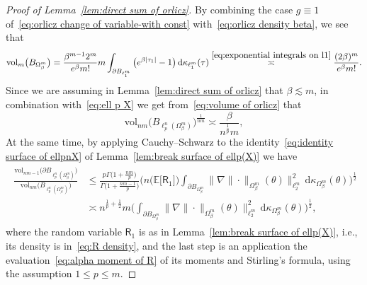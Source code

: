 \documentclass[11pt,reqno]{amsart}
\renewcommand{\le}{\leqslant}
\newcommand{\ud}[0]{\,\mathrm{d}}
\theoremstyle{remark}
\newcommand{\E}{\mathbb{ E}}
\newcommand{\vol}{\mathrm{vol}}
\renewcommand{\1}{\mathbf 1}
\begin{document}
\begin{proof}[Proof of Lemma~\ref{lem:direct sum of orlicz}] By combining the case $g\equiv 1$ of~\eqref{eq:orlicz change of variable-with const}  with~\eqref{eq:orlicz density beta}, we see that
\begin{equation}\label{eq:volume of orlicz}
\vol_m\big(B_{\Omega_\beta^m}\big)=\frac{\beta^{m-1}2^m}{e^\beta m!}m\int_{\partial B_{\ell_1^m}}  \big(e^{\beta|\tau_1|}-1\big) \ud \kappa_{\ell_1^m}(\tau)\stackrel{\eqref{eq:exponential integrals on l1}}{\asymp} \frac{(2\beta)^m}{e^\beta m!}.
\end{equation}
Since we are assuming in Lemma~\ref{lem:direct sum of orlicz} that $\beta\lesssim m$, in combination with~\eqref{eq:ell p X} we get from~\eqref{eq:volume of orlicz} that
\begin{equation}\label{eq:volume radius of orlicz}
\vol_{nm}\big(B_{\ell_p^n(\Omega_\beta^m)}\big)^{\frac{1}{nm}}\asymp \frac{\beta}{n^{\frac{1}{p}}m},
\end{equation}
At the same time, by applying  Cauchy–Schwarz to the identity~\eqref{eq:identity surface of ellpnX} of Lemma~\ref{lem:break surface of ellp(X)} we have
\begin{align}\label{eq:area by volume lp orlicz}
\begin{split}
\frac{\vol_{nm-1}\big(\partial B_{\ell_p^n(\Omega_\beta^m)}\big)}{\vol_{nm}\big(B_{\ell_p^n(\Omega_\beta^m)}\big)}&\le \frac{p\Gamma\big(1+\frac{nm}{p}\big)}{\Gamma\big(1+\frac{nm-1}{p}\big)}\bigg(n\Big(\E \big[\mathsf{R}_1\big]\Big) \int_{\partial B_{\Omega_\beta^m}}\big\|\nabla \|\cdot\|_{\Omega_\beta^m} (\theta)\big\|_{\ell_2^m}^2\ud\kappa_{\Omega_\beta^m}(\theta)\bigg)^{\frac12}\\&\asymp n^{\frac{1}{p}+\frac12}m\bigg(\int_{\partial B_{\Omega_\beta^m}}\big\|\nabla \|\cdot\|_{\Omega_\beta^m} (\theta)\big\|_{\ell_2^m}^2\ud\kappa_{\Omega_\beta^m}(\theta)\bigg)^{\frac12},
\end{split}
\end{align}
where the random variable $\mathsf{R}_1$ is as in Lemma~\ref{lem:break surface of ellp(X)}, i.e., its density is in~\eqref{eq:R density}, and the last step is an application the evaluation~\eqref{eq:alpha moment of R} of its  moments and Stirling's formula, using the assumption $1\le p\le m$.


\end{proof}
\end{document}
